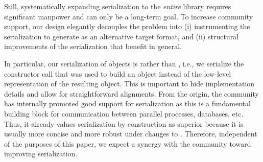 

Still, systematically expanding \OMMT serialization to the \emph{entire} \Sage library requires significant manpower and can only be a long-term goal.
To increase community support, our design elegantly decouples the problem into (i) instrumenting the serialization to generate \OMMT as an alternative target format, and (ii) structural improvements of the serialization that benefit \Sage in general.

In particular, our serialization of \Sage objects is  rather than , i.e., we serialize the constructor call that was used to build an object instead of the low-level \Python representation of the resulting object.
This is important to hide implementation details and allow for straightforward alignments.
From the origin, the \Sage community has internally promoted
good support for serialization as this is a fundamental building
block for communication between parallel processes, databases, etc.
Thus, it already values serialization by construction as
superior because it is usually more concise and more robust under
changes to \Sage. Therefore, independent of the purposes of this
paper, we expect a synergy with the \Sage community toward improving
serialization.




